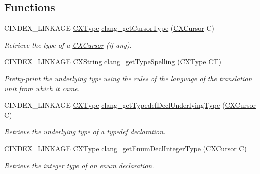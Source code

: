 \subsection*{Functions}
\begin{DoxyCompactItemize}
\item 
\mbox{\label{group__CINDEX__TYPES_gaae5702661bb1f2f93038051737de20f4}} 
C\+I\+N\+D\+E\+X\+\_\+\+L\+I\+N\+K\+A\+GE \mbox{\hyperlink{structCXType}{C\+X\+Type}} \mbox{\hyperlink{group__CINDEX__TYPES_gaae5702661bb1f2f93038051737de20f4}{clang\+\_\+get\+Cursor\+Type}} (\mbox{\hyperlink{structCXCursor}{C\+X\+Cursor}} C)
\begin{DoxyCompactList}\small\item\em Retrieve the type of a \mbox{\hyperlink{structCXCursor}{C\+X\+Cursor}} (if any). \end{DoxyCompactList}\item 
C\+I\+N\+D\+E\+X\+\_\+\+L\+I\+N\+K\+A\+GE \mbox{\hyperlink{structCXString}{C\+X\+String}} \mbox{\hyperlink{group__CINDEX__TYPES_gac9d37f61bede521d4f42a6553bcbc09f}{clang\+\_\+get\+Type\+Spelling}} (\mbox{\hyperlink{structCXType}{C\+X\+Type}} CT)
\begin{DoxyCompactList}\small\item\em Pretty-\/print the underlying type using the rules of the language of the translation unit from which it came. \end{DoxyCompactList}\item 
C\+I\+N\+D\+E\+X\+\_\+\+L\+I\+N\+K\+A\+GE \mbox{\hyperlink{structCXType}{C\+X\+Type}} \mbox{\hyperlink{group__CINDEX__TYPES_ga8de899fc18dc859b6fe3b97309f4fd52}{clang\+\_\+get\+Typedef\+Decl\+Underlying\+Type}} (\mbox{\hyperlink{structCXCursor}{C\+X\+Cursor}} C)
\begin{DoxyCompactList}\small\item\em Retrieve the underlying type of a typedef declaration. \end{DoxyCompactList}\item 
C\+I\+N\+D\+E\+X\+\_\+\+L\+I\+N\+K\+A\+GE \mbox{\hyperlink{structCXType}{C\+X\+Type}} \mbox{\hyperlink{group__CINDEX__TYPES_ga0f5f950bee4e1828b51a41f0eaa951c4}{clang\+\_\+get\+Enum\+Decl\+Integer\+Type}} (\mbox{\hyperlink{structCXCursor}{C\+X\+Cursor}} C)
\begin{DoxyCompactList}\small\item\em Retrieve the integer type of an enum declaration. \end{DoxyCompactList}\item 

\end{DoxyCompactItemize}
